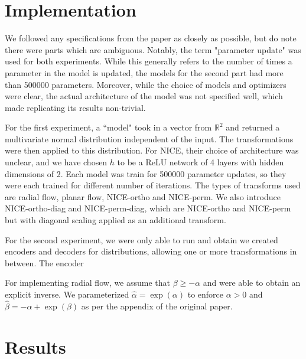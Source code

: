 \section{Implementation}

We followed any specifications from the paper as closely as possible, but do note there were parts which are ambiguous. Notably, the term "parameter update" was used for both experiments. While this generally refers to the number of times a parameter in the model is updated, the models for the second part had more than 500000 parameters. Moreover, while the choice of models and optimizers were clear, the actual architecture of the model was not specified well, which made replicating its results non-trivial.

For the first experiment, a ``model" took in a vector from $\mathbb{R}^2$ and returned a multivariate normal distribution independent of the input. The transformations were then applied to this distribution. For NICE, their choice of architecture was unclear, and we have chosen $h$ to be a ReLU network of 4 layers with hidden dimensions of 2. Each model was train for 500000 parameter updates, so they were each trained for different number of iterations. The types of transforms used are radial flow, planar flow, NICE-ortho and NICE-perm. We also introduce NICE-ortho-diag and NICE-perm-diag, which are NICE-ortho and NICE-perm but with diagonal scaling applied as an additional transform.

For the second experiment, we were only able to run and obtain we created encoders and decoders for distributions, allowing one or more transformations in between. The encoder 

For implementing radial flow, we assume that $\beta \geq -\alpha$ and were able to obtain an explicit inverse. We parameterized $\hat{\alpha} = \exp(\alpha)$ to enforce $\alpha > 0$ and $\hat{\beta} = -\alpha + \exp(\beta)$ as per the appendix of the original paper.

\section{Results}

